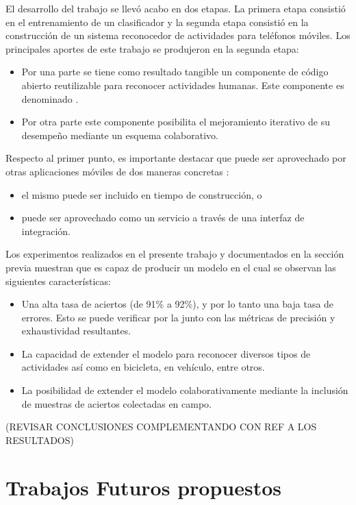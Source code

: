 El desarrollo del trabajo se llevó acabo en dos etapas. La primera
etapa consistió en el entrenamiento de un clasificador y la segunda
etapa consistió en la construcción de un sistema reconocedor de actividades
para teléfonos móviles. Los principales aportes de este trabajo se
produjeron en la segunda etapa:
\begin{itemize}
\item Por una parte se tiene como resultado tangible un componente de código
abierto reutilizable para reconocer actividades humanas. Este componente
es denominado \emph{}.
\item Por otra parte este componente posibilita el mejoramiento iterativo
de su desempeño mediante un esquema colaborativo.
\end{itemize}
Respecto al primer punto, es importante destacar que \emph{}
puede ser aprovechado por otras aplicaciones móviles de dos maneras
concretas \cite{GimenezYegros2016a}: 
\begin{itemize}
\item el mismo puede ser incluido en tiempo de construcción, o
\item puede ser aprovechado como un servicio a través de una interfaz de
integración.
\end{itemize}
Los experimentos realizados en el presente trabajo y documentados
en la sección previa muestran que \emph{} es capaz
de producir un modelo en el cual se observan las siguientes características:
\begin{itemize}
\item Una alta tasa de aciertos (de 91\% a 92\%), y por lo tanto una baja
tasa de errores. Esto se puede verificar por la 
junto con las métricas de precisión y exhaustividad resultantes.
\item La capacidad de extender el modelo para reconocer diversos tipos de
actividades así como en bicicleta, en vehículo, entre otros.
\item La posibilidad de extender el modelo colaborativamente mediante la
inclusión de muestras de aciertos colectadas en campo.
\end{itemize}
(REVISAR CONCLUSIONES COMPLEMENTANDO CON REF A LOS RESULTADOS)

\section{Trabajos Futuros propuestos}

